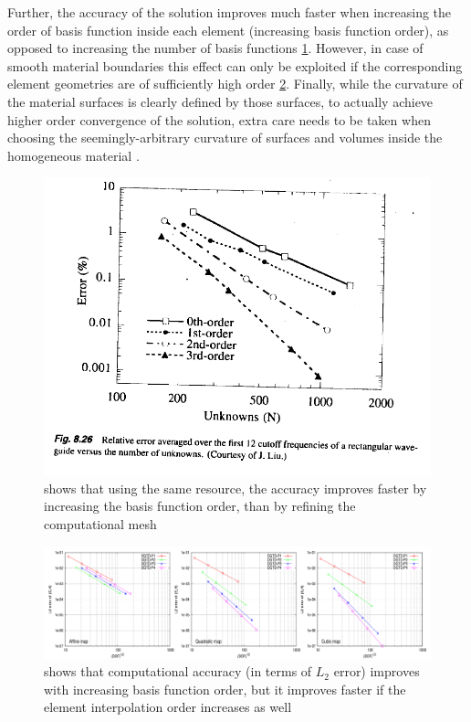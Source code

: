 \noindent
Further, the accuracy of the solution improves much faster when increasing the order of basis function inside each element (increasing basis function order), as opposed to increasing the number of basis functions \cite{jin2014} \cref{fig:jin:basisconv}. However, in case of smooth material boundaries this effect can only be exploited if the corresponding element geometries are of sufficiently high order \cite{fahs2011} \cref{fig:fahs:curvconv}. Finally, while the curvature of the material surfaces is clearly defined by those surfaces, to actually achieve higher order convergence of the solution, extra care needs to be taken when choosing the seemingly-arbitrary curvature of surfaces and volumes inside the homogeneous material \cite{lenoir1986}.

\begin{figure}
    \centering
    \includegraphics[scale=0.4]{images/Jin-basis-function-efficiency}
	\captionsetup{width=0.8\textwidth} 
	\caption{ \citeauthor{jin2014} shows that using the same resource, the accuracy improves faster by increasing the basis function order, than by refining the computational mesh }
	\label{fig:jin:basisconv}
\end{figure}

\begin{figure}
    \includegraphics[scale=0.25]{images/fahs-convergence}
	\captionsetup{width=0.8\textwidth} 
	\caption{ \citeauthor{fahs2011} shows that computational accuracy (in terms of $L_2$ error) improves with increasing basis function order, but it improves faster if the element interpolation order increases as well   }
	\label{fig:fahs:curvconv}
\end{figure}



